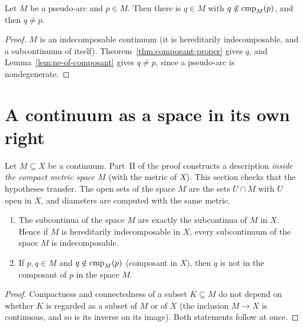 
\begin{corollary}\label{cor:other-composant}
Let $M$ be a pseudo-arc and $p\in M$. Then there is $q\in M$ with $q\notin\operatorname{cmp}_{M}(p)$, and then
$q\neq p$.
\end{corollary}

\begin{proof}
$M$ is an indecomposable continuum (it is hereditarily indecomposable, and a subcontinuum of itself).
Theorem~\ref{thm:composant-proper} gives $q$, and Lemma~\ref{lem:ne-of-composant} gives $q\neq p$,
since a pseudo-arc is nondegenerate.
\end{proof}


\section{A continuum as a space in its own right}\label{sec:subspace}

Let $M\subseteq X$ be a continuum. Part~II of the proof constructs a description \emph{inside the
compact metric space $M$} (with the metric of $X$). This section checks that the hypotheses
transfer. The open sets of the space $M$ are the sets $U\cap M$ with $U$ open in $X$, and diameters
are computed with the same metric.

\begin{lemma}\label{lem:sub-HI}
\begin{enumerate}[label=(\alph*)]
\item The subcontinua of the space $M$ are exactly the subcontinua of $M$ in $X$. Hence if $M$ is
hereditarily indecomposable in $X$, every subcontinuum of the space $M$ is indecomposable.
\item If $p,q\in M$ and $q\notin\operatorname{cmp}_{M}(p)$ (composant in $X$), then $q$ is not in the composant of $p$
in the space $M$.
\end{enumerate}
\end{lemma}

\begin{proof}
Compactness and connectedness of a subset $K\subseteq M$ do not depend on whether $K$ is regarded as
a subset of $M$ or of $X$ (the inclusion $M\to X$ is continuous, and so is its inverse on its
image). Both statements follow at once.
\end{proof}

